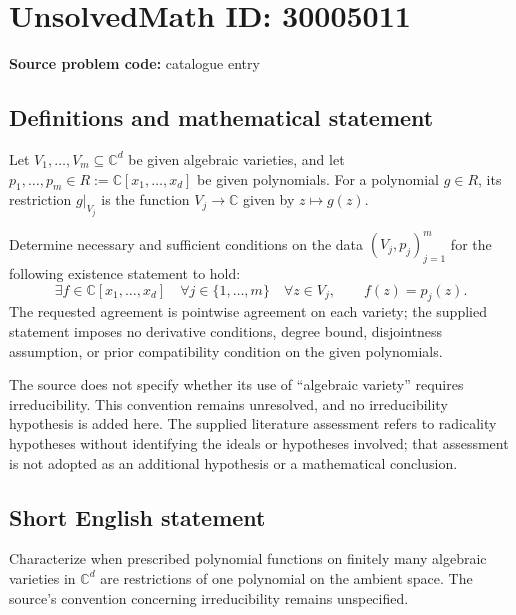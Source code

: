 \documentclass[11pt]{article}
\newcommand{\C}{\mathbb{C}}
\begin{document}
\section*{UnsolvedMath ID: 30005011}
\textbf{Source problem code:} catalogue entry
\subsection{Definitions and mathematical statement}
Let \(V_1,\ldots,V_m\subseteq\C^d\) be given algebraic varieties, and let \(p_1,\ldots,p_m\in R:=\C[x_1,\ldots,x_d]\) be given polynomials. For a polynomial \(g\in R\), its restriction \(g|_{V_j}\) is the function \(V_j\to\C\) given by \(z\mapsto g(z)\).

Determine necessary and sufficient conditions on the data \((V_j,p_j)_{j=1}^m\) for the following existence statement to hold:
\[
\exists f\in\C[x_1,\ldots,x_d]\quad
\forall j\in\{1,\ldots,m\}\quad
\forall z\in V_j,\qquad f(z)=p_j(z).
\]
The requested agreement is pointwise agreement on each variety; the supplied statement imposes no derivative conditions, degree bound, disjointness assumption, or prior compatibility condition on the given polynomials.

The source does not specify whether its use of ``algebraic variety'' requires irreducibility. This convention remains unresolved, and no irreducibility hypothesis is added here. The supplied literature assessment refers to radicality hypotheses without identifying the ideals or hypotheses involved; that assessment is not adopted as an additional hypothesis or a mathematical conclusion.
\subsection{Short English statement}
Characterize when prescribed polynomial functions on finitely many algebraic varieties in \(\C^d\) are restrictions of one polynomial on the ambient space. The source's convention concerning irreducibility remains unspecified.
\end{document}
